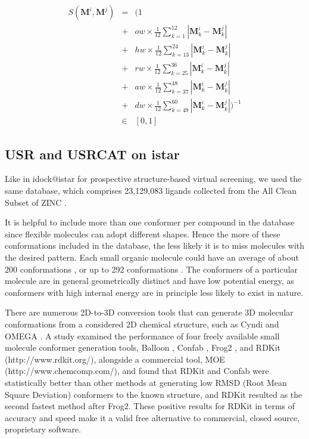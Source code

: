 \documentclass[a4,center,fleqn]{NAR}
\begin{document}
\begin{eqnarray}
S(\mathbf M^i, \mathbf M^j)&=&(1\nonumber\\
&+&ow\times\frac{1}{12}\sum_{k= 1}^{12}|\mathbf M_k^i-\mathbf M_k^j|\nonumber\\
&+&hw\times\frac{1}{12}\sum_{k=13}^{24}|\mathbf M_k^i-\mathbf M_k^j|\nonumber\\
&+&rw\times\frac{1}{12}\sum_{k=25}^{36}|\mathbf M_k^i-\mathbf M_k^j|\nonumber\\
&+&aw\times\frac{1}{12}\sum_{k=37}^{48}|\mathbf M_k^i-\mathbf M_k^j|\nonumber\\
&+&dw\times\frac{1}{12}\sum_{k=49}^{60}|\mathbf M_k^i-\mathbf M_k^j|)^{-1}\nonumber\\
&\in&[0, 1]
\label{usrcatscore}
\end{eqnarray}

\subsection{USR and USRCAT on istar}

Like in idock@istar for prospective structure-based virtual screening, we used the same database, which comprises 23,129,083 ligands collected from the All Clean Subset of ZINC \cite{532,1178}.

It is helpful to include more than one conformer per compound in the database since flexible molecules can adopt different shapes. Hence the more of these conformations included in the database, the less likely it is to miss molecules with the desired pattern. Each small organic molecule could have an average of about 200 conformations \cite{1332}, or up to 292 conformations \cite{1280}. The conformers of a particular molecule are in general geometrically distinct and have low potential energy, as conformers with high internal energy are in principle less likely to exist in nature.

There are numerous 2D-to-3D conversion tools that can generate 3D molecular conformations from a considered 2D chemical structure, such as Cyndi \cite{1393,1394} and OMEGA \cite{462}. A study \cite{1127} examined the performance of four freely available small molecule conformer generation tools, Balloon \cite{1442}, Confab \cite{1443}, Frog2 \cite{1444}, and RDKit (http://www.rdkit.org/), alongside a commercial tool, MOE (http://www.chemcomp.com/), and found that RDKit and Confab were statistically better than other methods at generating low RMSD (Root Mean Square Deviation) conformers to the known structure, and RDKit resulted as the second fastest method after Frog2. These positive results for RDKit in terms of accuracy and speed make it a valid free alternative to commercial, closed source, proprietary software.
\end{document}
